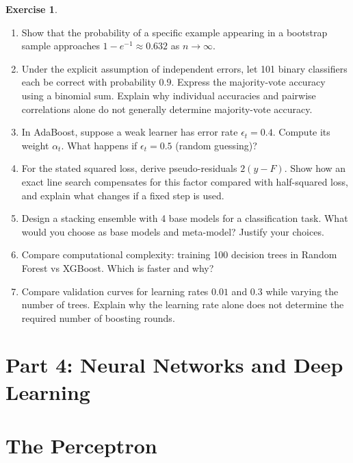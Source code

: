 \documentclass[11pt,twoside]{article}
\numberwithin{equation}{section}
\theoremstyle{plain}
\theoremstyle{definition}
\newtheorem{exercise}[theorem]{Exercise}
\theoremstyle{remark}
\begin{document}
\begin{exercise}
\begin{enumerate}
\item Show that the probability of a specific example appearing in a bootstrap sample approaches $1 - e^{-1} \approx 0.632$ as $n \to \infty$.

\item Under the explicit assumption of independent errors, let 101 binary classifiers each be correct with probability $0.9$. Express the majority-vote accuracy using a binomial sum. Explain why individual accuracies and pairwise correlations alone do not generally determine majority-vote accuracy.

\item In AdaBoost, suppose a weak learner has error rate $\epsilon_t = 0.4$. Compute its weight $\alpha_t$. What happens if $\epsilon_t = 0.5$ (random guessing)?

\item For the stated squared loss, derive pseudo-residuals $2(y-F)$. Show how an exact line search compensates for this factor compared with half-squared loss, and explain what changes if a fixed step is used.

\item Design a stacking ensemble with 4 base models for a classification task. What would you choose as base models and meta-model? Justify your choices.

\item Compare computational complexity: training 100 decision trees in Random Forest vs XGBoost. Which is faster and why?

\item Compare validation curves for learning rates $0.01$ and $0.3$ while varying the number of trees. Explain why the learning rate alone does not determine the required number of boosting rounds.
\end{enumerate}
\end{exercise}

\section*{Part 4: Neural Networks and Deep Learning}

\section{The Perceptron}
\label{sec:perceptron}
\end{document}
